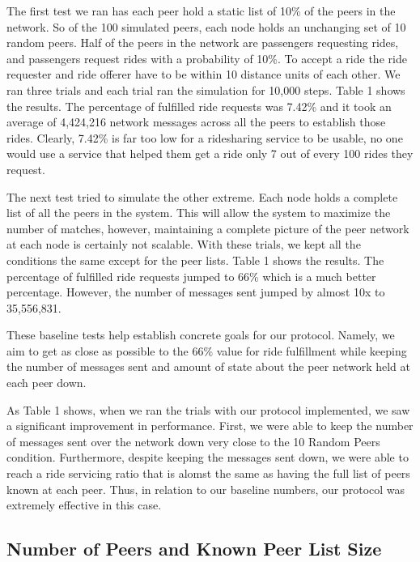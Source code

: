 \documentclass[letterpaper,11pt,twocolumn]{article}
\begin{document}
The first test we ran has each peer hold a static list of 10\% of the peers in the network. So of the 100 simulated peers, each node holds an unchanging set of 10 random peers. Half of the peers in the network are passengers requesting rides, and passengers request rides with a probability of 10\%. To accept a ride the ride requester and ride offerer have to be within 10 distance units of each other. We ran three trials and each trial ran the simulation for 10,000 steps. Table 1 shows the results. The percentage of fulfilled ride requests was 7.42\% and it took an average of 4,424,216 network messages across all the peers to establish those rides. Clearly, 7.42\% is far too low for a ridesharing service to be usable, no one would use a service that helped them get a ride only 7 out of every 100 rides they request.

The next test tried to simulate the other extreme. Each node holds a complete list of all the peers in the system. This will allow the system to maximize the number of matches, however, maintaining a complete picture of the peer network at each node is certainly not scalable. With these trials, we kept all the conditions the same except for the peer lists. Table 1 shows the results. The percentage of fulfilled ride requests jumped to 66\% which is a much better percentage. However, the number of messages sent jumped by almost 10x to 35,556,831.

These baseline tests help establish concrete goals for our protocol. Namely, we aim to get as close as possible to the 66\% value for ride fulfillment while keeping the number of messages sent and amount of state about the peer network held at each peer down.

As Table 1 shows, when we ran the trials with our protocol implemented, we saw a significant improvement in performance. First, we were able to keep the number of messages sent over the network down very close to the 10 Random Peers condition. Furthermore, despite keeping the messages sent down, we were able to reach a ride servicing ratio that is alomst the same as having the full list of peers known at each peer. Thus, in relation to our baseline numbers, our protocol was extremely effective in this case.

\subsection{Number of Peers and Known Peer List Size}
\end{document}
